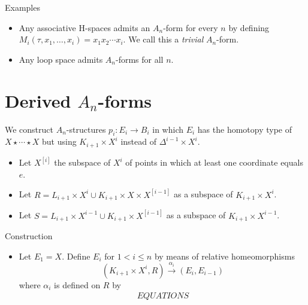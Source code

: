\documentclass{beamer}
\theoremstyle{definition}
\begin{document}
\begin{frame}
\begin{block}{Examples}
\begin{itemize}
\item<1->Any associative H-spaces admits an $A_n$-form for every $n$ by defining $M_i(\tau,x_1,\dots,x_i)=x_1x_2\cdots x_i$. We call this a \emph{trivial} $A_n$-form.
\item<2-> Any loop space admits $A_n$-forms for all $n$.
\end{itemize}
\end{block}

\end{frame}


\section{Derived $A_n$-forms}

\begin{frame}
We construct $A_n$-structures $p_i:E_i\to B_i$ in which $E_i$ has the homotopy type of $X\star\cdots\star X$ but using $K_{i+1}\times X^i$ instead of $\Delta^{i-1}\times X^i$.
\begin{itemize}
\item<2-> Let $X^{[i]}$ the subspace of $X^i$ of points in which at least one coordinate equals $e$.
\item<3-> Let $R=L_{i+1}\times X^i\cup K_{i+1}\times X\times X^{[i-1]}$ as a subspace of $K_{i+1}\times X^i$.
\item<4-> Let $S=L_{i+1}\times X^{i-1}\cup K_{i+1}\times X^{[i-1]}$ as a subspace of $K_{i+1}\times X^{i-1}$.
\end{itemize}
\end{frame}

\begin{frame}
\begin{block}{Construction}
\begin{itemize}
\item Let $E_1=X$. Define $E_i$ for $1<i\leq n$ by means of relative homeomorphisms %
\[
(K_{i+1}\times X^i,R)\xrightarrow{\alpha_i} (E_i,E_{i-1})
\]
where $\alpha_i$ is defined on $R$ by %
\begin{align*}
EQUATIONS
\end{align*}
\end{itemize}
\end{block}
\end{frame}
\end{document}
